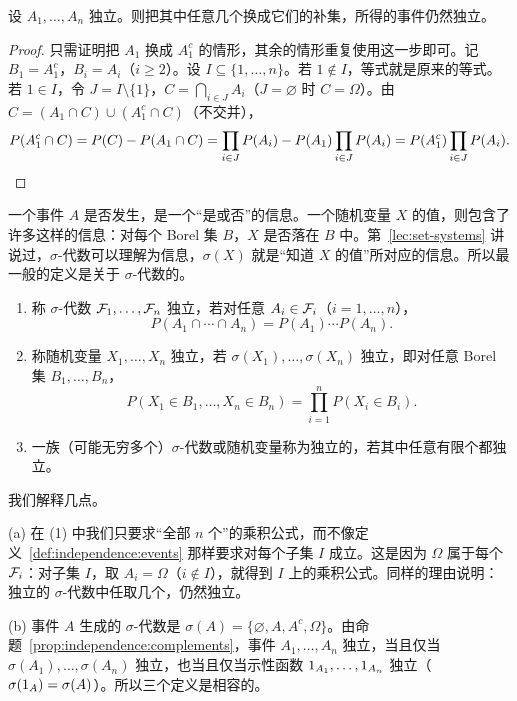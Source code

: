 \begin{proposition}[补事件保持独立性]\label{prop:independence:complements}
设 $A_1,\dots,A_n$ 独立。则把其中任意几个换成它们的补集，所得的事件仍然独立。
\end{proposition}
\begin{proof}
只需证明把 $A_1$ 换成 $A_1^c$ 的情形，其余的情形重复使用这一步即可。记 $B_1=A_1^c$，$B_i=A_i$（$i\geqslant2$）。设 $I\subseteq\{1,\dots,n\}$。若 $1\notin I$，等式就是原来的等式。若 $1\in I$，令 $J=I\setminus\{1\}$，$C=\bigcap_{i\in J}A_i$（$J=\varnothing$ 时 $C=\Omega$）。由 $C=(A_1\cap C)\cup(A_1^c\cap C)$（不交并），
\[
P(A_1^c\cap C)=P(C)-P(A_1\cap C)=\prod_{i\in J}P(A_i)-P(A_1)\prod_{i\in J}P(A_i)=P(A_1^c)\prod_{i\in J}P(A_i).\qedhere
\]
\end{proof}


一个事件 $A$ 是否发生，是一个“是或否”的信息。一个随机变量 $X$ 的值，则包含了许多这样的信息：对每个 Borel 集 $B$，$X$ 是否落在 $B$ 中。第~\ref{lec:set-systems} 讲说过，$\sigma$-代数可以理解为信息，$\sigma(X)$ 就是“知道 $X$ 的值”所对应的信息。所以最一般的定义是关于 $\sigma$-代数的。

\begin{definition}\label{def:independence:sigma}
\begin{enumerate}
\item 称 $\sigma$-代数 $\mathcal{F}_1,\dots,\mathcal{F}_n$ 独立，若对任意 $A_i\in\mathcal{F}_i$（$i=1,\dots,n$），
\[
P(A_1\cap\cdots\cap A_n)=P(A_1)\cdots P(A_n).
\]
\item 称随机变量 $X_1,\dots,X_n$ 独立，若 $\sigma(X_1),\dots,\sigma(X_n)$ 独立，即对任意 Borel 集 $B_1,\dots,B_n$，
\[
P(X_1\in B_1,\dots,X_n\in B_n)=\prod_{i=1}^nP(X_i\in B_i).
\]
\item 一族（可能无穷多个）$\sigma$-代数或随机变量称为独立的，若其中任意有限个都独立。
\end{enumerate}
\end{definition}

我们解释几点。

(a) 在 (1) 中我们只要求“全部 $n$ 个”的乘积公式，而不像定义~\ref{def:independence:events} 那样要求对每个子集 $I$ 成立。这是因为 $\Omega$ 属于每个 $\mathcal{F}_i$：对子集 $I$，取 $A_i=\Omega$（$i\notin I$），就得到 $I$ 上的乘积公式。同样的理由说明：独立的 $\sigma$-代数中任取几个，仍然独立。

(b) 事件 $A$ 生成的 $\sigma$-代数是 $\sigma(A)=\{\varnothing,A,A^c,\Omega\}$。由命题~\ref{prop:independence:complements}，事件 $A_1,\dots,A_n$ 独立，当且仅当 $\sigma(A_1),\dots,\sigma(A_n)$ 独立，也当且仅当示性函数 $1_{A_1},\dots,1_{A_n}$ 独立（$\sigma(1_A)=\sigma(A)$）。所以三个定义是相容的。

